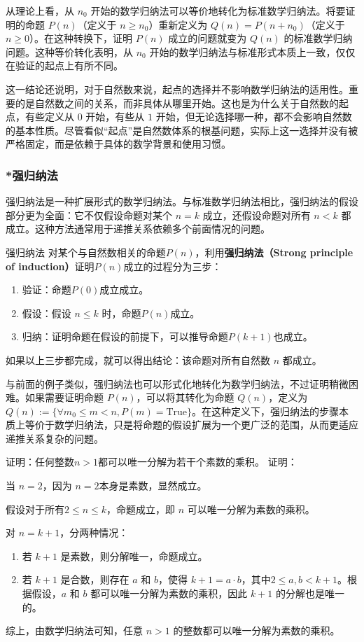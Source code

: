 从理论上看，从 $n_0$ 开始的数学归纳法可以等价地转化为标准数学归纳法。将要证明的命题 $P(n)$（定义于 $n \geq n_0$）重新定义为 $Q(n) = P(n + n_0)$（定义于 $n \geq 0$）。在这种转换下，证明 $P(n)$ 成立的问题就变为 $Q(n)$ 的标准数学归纳问题。这种等价转化表明，从 $n_0$ 开始的数学归纳法与标准形式本质上一致，仅仅在验证的起点上有所不同。

这一结论还说明，对于自然数来说，起点的选择并不影响数学归纳法的适用性。重要的是自然数之间的关系，而非具体从哪里开始。这也是为什么关于自然数的起点，有些定义从 $0$ 开始，有些从 $1$ 开始，但无论选择哪一种，都不会影响自然数的基本性质。尽管看似“起点”是自然数体系的根基问题，实际上这一选择并没有被严格固定，而是依赖于具体的数学背景和使用习惯。

\subsubsection{*强归纳法}

强归纳法是一种扩展形式的数学归纳法。与标准数学归纳法相比，强归纳法的假设部分更为全面：它不仅假设命题对某个 $n = k$ 成立，还假设命题对所有 $n<k$ 都成立。这种方法通常用于递推关系依赖多个前面情况的问题。

\begin{definition}{强归纳法}
对某个与自然数相关的命题$P(n)$，利用\textbf{强归纳法（Strong principle of induction）}证明$P(n)$成立的过程分为三步：
\begin{enumerate}
\item 验证：命题$P(0)$成立成立。
\item 假设：假设 $n\leq k$ 时，命题$P(n)$成立。
\item 归纳：证明命题在假设的前提下，可以推导命题$P(k+1)$也成立。
\end{enumerate}
如果以上三步都完成，就可以得出结论：该命题对所有自然数 $n$ 都成立。
\end{definition}

与前面的例子类似，强归纳法也可以形式化地转化为数学归纳法，不过证明稍微困难。如果需要证明命题 $P(n)$，可以将其转化为命题 $Q(n)$，定义为 $Q(n) := \{\forall m_0 \leq m < n, P(m) = \text{True}\}$。在这种定义下，强归纳法的步骤本质上等价于数学归纳法，只是将命题的假设扩展为一个更广泛的范围，从而更适应递推关系复杂的问题。

\begin{example}{证明：任何整数$n>1$都可以唯一分解为若干个素数的乘积。}
证明：

当 $n = 2$，因为 $n = 2$本身是素数，显然成立。

假设对于所有$2 \leq n \leq k$，命题成立，即 $n$ 可以唯一分解为素数的乘积。

对 $n = k+1$，分两种情况：
\begin{enumerate}
\item 若 $k+1$ 是素数，则分解唯一，命题成立。
\item 若 $k+1$ 是合数，则存在 $a$ 和 $b$，使得 $k+1=a \cdot b$，其中$2 \leq a, b < k+1$。根据假设，$a$ 和 $b$ 都可以唯一分解为素数的乘积，因此 $k+1$ 的分解也是唯一的。
\end{enumerate}
综上，由数学归纳法可知，任意 $n>1$ 的整数都可以唯一分解为素数的乘积。
\end{example}

